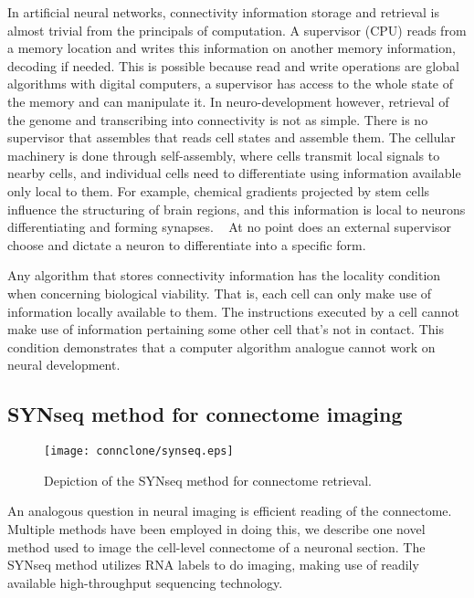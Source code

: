 \documentclass[../dissertation.tex]{subfiles}
\begin{document}
In artificial neural networks, connectivity information storage and retrieval is almost trivial from the principals of computation.
A supervisor (CPU) reads from a memory location and writes this information on another memory information, decoding if needed.
This is possible because read and write operations are global algorithms with digital computers, a supervisor has access to the whole state of the memory and can manipulate it.
In neuro-development however, retrieval of the genome and transcribing into connectivity is not as simple.
There is no supervisor that assembles that reads cell states and assemble them.
The cellular machinery is done through self-assembly, where cells transmit local signals to nearby cells, and individual cells need to differentiate using information available only local to them.
For example, chemical gradients projected by stem cells influence the structuring of brain regions, and this information is local to neurons differentiating and forming synapses.
~\cite{fly-neurodevelopment,fly-brain-regions}
At no point does an external supervisor choose and dictate a neuron to differentiate into a specific form.

Any algorithm that stores connectivity information has the locality condition when concerning biological viability.
That is, each cell can only make use of information locally available to them.
The instructions executed by a cell cannot make use of information pertaining some other cell that's not in contact.
This condition demonstrates that a computer algorithm analogue cannot work on neural development.

\subsection{SYNseq method for connectome imaging}

\begin{figure}[ht]
    \centering
    \texttt{[image: connclone/synseq.eps]}
    \caption{Depiction of the SYNseq method for connectome retrieval.}
    \label{fig:cc-synseq}
\end{figure}

An analogous question in neural imaging is efficient reading of the connectome.
Multiple methods have been employed in doing this, we describe one novel method used to image the cell-level connectome of a neuronal section.
The SYNseq method utilizes RNA labels to do imaging, making use of readily available high-throughput sequencing technology.~\cite{peikonUsingHighthroughputBarcode2017a}
\end{document}
